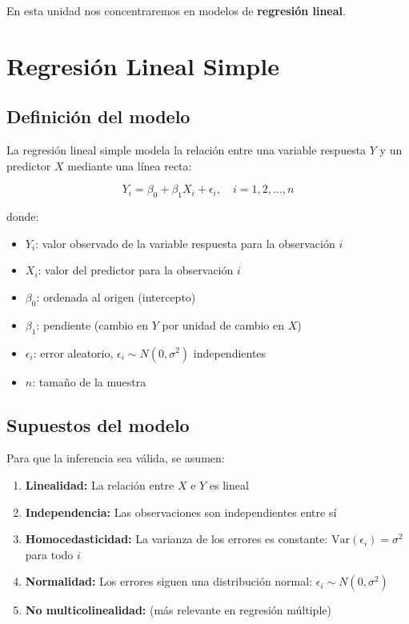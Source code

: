 \documentclass[11pt,a4paper]{article}
\begin{document}
En esta unidad nos concentraremos en modelos de \textbf{regresión lineal}.

\section{Regresión Lineal Simple}

\subsection{Definición del modelo}

La regresión lineal simple modela la relación entre una variable respuesta $Y$ y un predictor $X$ mediante una línea recta:

\begin{equation}
Y_i = \beta_0 + \beta_1 X_i + \epsilon_i, \quad i = 1, 2, \ldots, n
\end{equation}

donde:
\begin{itemize}
    \item $Y_i$: valor observado de la variable respuesta para la observación $i$
    \item $X_i$: valor del predictor para la observación $i$
    \item $\beta_0$: ordenada al origen (intercepto)
    \item $\beta_1$: pendiente (cambio en $Y$ por unidad de cambio en $X$)
    \item $\epsilon_i$: error aleatorio, $\epsilon_i \sim N(0, \sigma^2)$ independientes
    \item $n$: tamaño de la muestra
\end{itemize}

\subsection{Supuestos del modelo}

Para que la inferencia sea válida, se asumen:

\begin{enumerate}
    \item \textbf{Linealidad:} La relación entre $X$ e $Y$ es lineal
    \item \textbf{Independencia:} Las observaciones son independientes entre sí
    \item \textbf{Homocedasticidad:} La varianza de los errores es constante: $\text{Var}(\epsilon_i) = \sigma^2$ para todo $i$
    \item \textbf{Normalidad:} Los errores siguen una distribución normal: $\epsilon_i \sim N(0, \sigma^2)$
    \item \textbf{No multicolinealidad:} (más relevante en regresión múltiple)
\end{enumerate}
\end{document}
